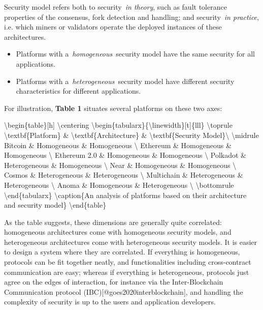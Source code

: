Security model refers both to security~\emph{in theory}, such as fault
tolerance properties of the consensus, fork detection and handling; and
security~\emph{in practice}, i.e. which miners or validators operate the
deployed instances of these architectures.

\begin{itemize}
\tightlist
\item
  Platforms with a~\emph{homogeneous}~security model have the same
  security for all applications.
\item
  Platforms with a~\emph{heterogeneous}~security model have different
  security characteristics for different applications.
\end{itemize}

For illustration, \textbf{Table 1} situates several platforms on these
two axes:

\textbackslash begin\{table\}{[}h{]} \textbackslash centering
\textbackslash begin\{tabularx\}\{\textbackslash linewidth\}{[}t{]}\{lll\}
\textbackslash toprule \textbackslash textbf\{Platform\} \&
\textbackslash textbf\{Architecture\} \& \textbackslash textbf\{Security
Model\}\textbackslash{} \textbackslash midrule Bitcoin \& Homogeneous \&
Homogeneous \textbackslash{} Ethereum \& Homogeneous \& Homogeneous
\textbackslash{} Ethereum 2.0 \& Homogeneous \& Homogeneous
\textbackslash{} Polkadot \& Heterogeneous \& Homogeneous
\textbackslash{} Near \& Homogeneous \& Homogeneous \textbackslash{}
Cosmos \& Heterogeneous \& Heterogeneous \textbackslash{} Multichain \&
Heterogeneous \& Heterogeneous \textbackslash{} Anoma \& Homogeneous \&
Heterogeneous \textbackslash{} \textbackslash bottomrule
\textbackslash end\{tabularx\} \textbackslash caption\{An analysis of
platforms based on their architecture and security model\}
\textbackslash end\{table\}

As the table suggests, these dimensions are generally quite correlated:
homogeneous architectures come with homogeneous security models, and
heterogeneous architectures come with heterogeneous security models. It
is easier to design a system where they are correlated. If everything is
homogeneous, protocols can be fit together neatly, and functionalities
including cross-contract communication are easy; whereas if everything
is heterogeneous, protocols just agree on the edges of interaction, for
instance via the Inter-Blockchain Communication protocol
(IBC){[}@goes2020interblockchain{]}, and handling the complexity of
security is up to the users and application developers.

